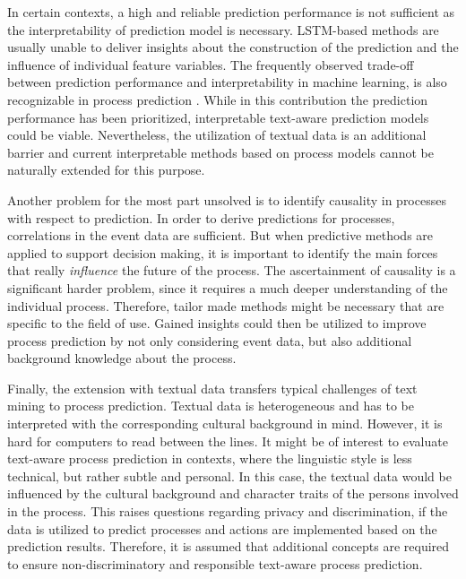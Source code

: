 In certain contexts, a high and reliable prediction performance is not sufficient as the interpretability of prediction model is necessary.
LSTM-based methods are usually unable to deliver insights about the construction of the prediction and the influence of individual feature variables.
The frequently observed trade-off between prediction performance and interpretability in machine learning, is also recognizable in process prediction \cite{DBLP:journals/sosym/TaxTZ20}.
While in this contribution the prediction performance has been prioritized, interpretable text-aware prediction models could be viable.
Nevertheless, the utilization of textual data is an additional barrier and current interpretable methods based on process models cannot be naturally extended for this purpose.

Another problem for the most part unsolved is to identify causality in processes with respect to prediction.
In order to derive predictions for processes, correlations in the event data are sufficient.
But when predictive methods are applied to support decision making, it is important to identify the main forces that really \textit{influence} the future of the process.
The ascertainment of causality is a significant harder problem, since it requires a much deeper understanding of the individual process.
Therefore, tailor made methods might be necessary that are specific to the field of use.
Gained insights could then be utilized to improve process prediction by not only considering event data, but also additional background knowledge about the process.

Finally, the extension with textual data transfers typical challenges of text mining to process prediction.
Textual data is heterogeneous and has to be interpreted with the corresponding cultural background in mind.
However, it is hard for computers to read between the lines.
It might be of interest to evaluate text-aware process prediction in contexts, where the linguistic style is less technical, but rather subtle and personal.
In this case, the textual data would be influenced by the cultural background and character traits of the persons involved in the process.
This raises questions regarding privacy and discrimination, if the data is utilized to predict processes and actions are implemented based on the prediction results.
Therefore, it is assumed that additional concepts are required to ensure non-discriminatory and responsible text-aware process prediction.